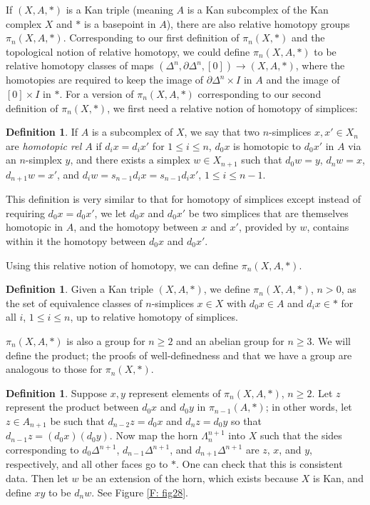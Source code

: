 \documentclass[12pt]{article}
\theoremstyle{plain}
\theoremstyle{definition}
\newtheorem{definition}[theorem]{Definition}
\newcommand{\bd}{\partial}
\begin{document}
If $(X,A,*)$ is a Kan triple (meaning $A$ is a Kan subcomplex of the Kan complex $X$ and $*$ is a basepoint in $A$), there are also relative homotopy groups $\pi_n(X,A,*)$. Corresponding to our first definition of $\pi_n(X,*)$ and the topological notion of relative homotopy, we could define $\pi_n(X,A,*)$ to be relative homotopy classes of maps $(\Delta^n,\bd \Delta^n,[0])\to (X,A,*)$, where the homotopies are required to keep the image of $\bd \Delta^n\times I$ in $A$ and the image of $[0]\times I$ in $*$. For a  version of $\pi_n(X,A,*)$ corresponding to our second definition of $\pi_n(X,*)$, we first need a relative notion of homotopy of simplices:



\begin{definition}\label{D: rel homotopy of simplices}
If $A$ is a subcomplex of $X$, we say that two $n$-simplices $x,x'\in X_n$ are \emph{homotopic rel $A$} if $d_ix=d_ix'$ for $1\leq i\leq n$, $d_0x$ is homotopic to $d_0x'$ in $A$ via an $n$-simplex $y$, and there exists a simplex $w\in X_{n+1}$ such that $d_0w=y$, $d_nw=x$, $d_{n+1}w=x'$, and $d_iw=s_{n-1}d_ix=s_{n-1}d_ix'$, $1\leq i\leq n-1$.  
\end{definition}

This definition is very similar to that for homotopy of simplices except instead of requiring $d_0x=d_0x'$, we let $d_0x$ and $d_0x'$ be  two simplices that are themselves homotopic in $A$, and the homotopy between $x$ and $x'$, provided by $w$, contains within it the homotopy between $d_0x$ and $d_0x'$. 

Using this relative notion of homotopy, we can define $\pi_n(X,A,*)$.


\begin{definition}
Given a Kan triple $(X,A,*)$, we define $\pi_n(X,A,*)$, $n>0$, as the set of equivalence classes of $n$-simplices $x\in X$ with $d_0x\in A$ and $d_ix\in *$ for all $i$, $1\leq i\leq n$, up to relative homotopy of simplices. 
\end{definition}

$\pi_n(X,A,*)$ is also a group for $n\geq 2$ and an abelian group for $n\geq 3$. We will define the product; the proofs of well-definedness and that we have a group are analogous to those for $\pi_n(X,*)$.

\begin{definition}
Suppose $x,y$ represent elements of $\pi_n(X,A,*)$, $n\geq 2$. Let $z$ represent the product between $d_0x$ and $d_0y$ in $\pi_{n-1}(A,*)$; in other words, let $z\in A_{n+1}$ be such that $d_{n-2}z=d_0x$ and $d_{n}z=d_0y$ so that $d_{n-1}z=(d_0x)(d_0y)$. Now map the horn $\Lambda^{n+1}_n$ into $X$ such that the sides corresponding to $d_0\Delta^{n+1}$, $d_{n-1}\Delta^{n+1}$, and $d_{n+1}\Delta^{n+1}$ are $z$, $x$, and $y$, respectively, and all other faces go to $*$. One can check that this is consistent data. Then let $w$ be an extension of the horn, which exists because $X$ is Kan, and define $xy$ to be $d_nw$.  See Figure \ref{F: fig28}.
\end{definition}
\end{document}

